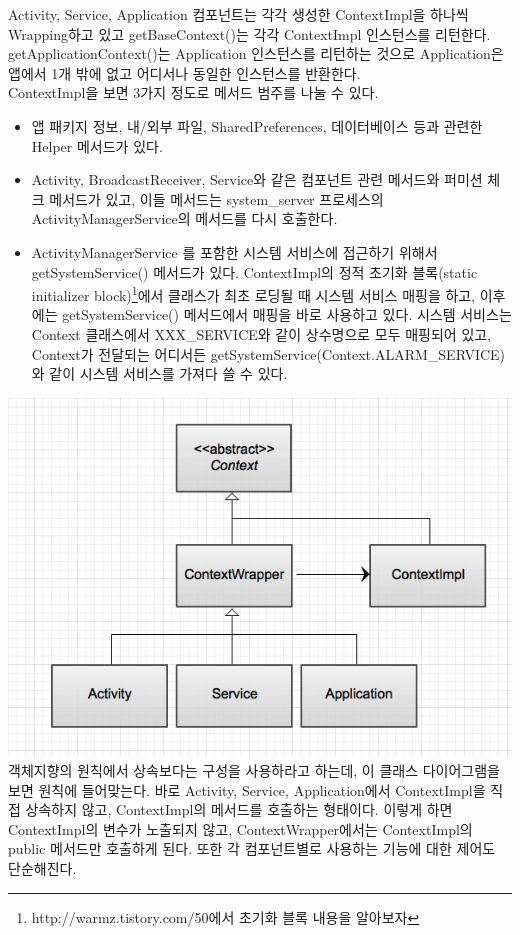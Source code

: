 Activity, Service, Application 컴포넌트는 각각 생성한 ContextImpl을 하나씩 Wrapping하고 있고 getBaseContext()는 각각 ContextImpl 인스턴스를 리턴한다. getApplicationContext()는 Application 인스턴스를 리턴하는 것으로 Application은 앱에서 1개 밖에 없고 어디서나 동일한 인스턴스를 반환한다.\\

ContextImpl을 보면 3가지 정도로 메서드 범주를 나눌 수 있다.
\begin{itemize}
\item 앱 패키지 정보, 내/외부 파일, SharedPreferences, 데이터베이스 등과 관련한 Helper 메서드가 있다. 
\item Activity, BroadcastReceiver, Service와 같은 컴포넌트 관련 메서드와 퍼미션 체크 메서드가 있고, 이들 메서드는 system\_server 프로세스의 ActivityManagerService의 메서드를 다시 호출한다. 
\item ActivityManagerService 를 포함한 시스템 서비스에 접근하기 위해서 getSystemService() 메서드가 있다. ContextImpl의 정적 초기화 블록(static initializer block)\footnote{http://warmz.tistory.com/50에서 초기화 블록 내용을 알아보자}에서 클래스가 최초 로딩될 때 시스템 서비스 매핑을 하고, 이후에는 getSystemService() 메서드에서 매핑을 바로 사용하고 있다.
시스템 서비스는 Context 클래스에서 XXX\_SERVICE와 같이 상수명으로 모두 매핑되어 있고, Context가 전달되는 어디서든 getSystemService(Context.ALARM\_SERVICE)와 같이 시스템 서비스를 가져다 쓸 수 있다.
\end{itemize}

\includegraphics[scale=0.5]{context}\\
객체지향의 원칙에서 상속보다는 구성을 사용하라고 하는데, 이 클래스 다이어그램을 보면 원칙에 들어맞는다.
바로 Activity, Service, Application에서 ContextImpl을 직접 상속하지 않고, ContextImpl의 메서드를 호출하는 형태이다. 이렇게 하면 ContextImpl의 변수가 노출되지 않고, ContextWrapper에서는 ContextImpl의 public 메서드만 호출하게 된다. 또한 각 컴포넌트별로 사용하는 기능에 대한 제어도 단순해진다.\\

